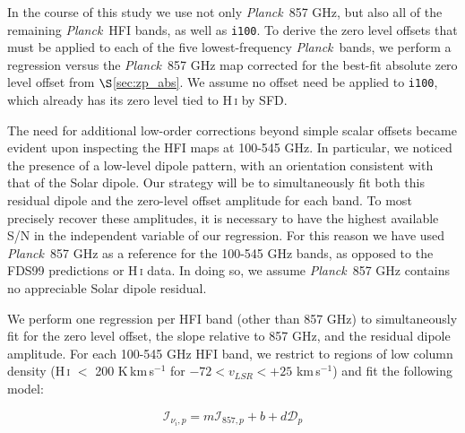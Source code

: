 \documentclass{emulateapj}
\newcommand{\PLANCK}{{\it Planck}}
\begin{document}
In the course of this study we use not only \PLANCK~857 GHz, but also all of
the remaining \PLANCK~HFI bands, as well as \verb|i100|. To derive the 
zero level offsets that must be applied to each of the five lowest-frequency 
\PLANCK~bands, we perform a regression versus the \PLANCK~857 GHz map corrected
for the best-fit absolute zero level offset from $\S$\ref{sec:zp_abs}. We 
assume no offset need be applied to \verb|i100|, which already has its zero 
level tied to H\,\textsc{i} by SFD.

The need for additional low-order corrections beyond simple scalar offsets 
became evident upon inspecting the HFI maps at 100-545 GHz. In particular, we 
noticed the presence of a low-level dipole pattern, with an orientation 
consistent with that of the Solar dipole. Our strategy will be to 
simultaneously fit both this residual dipole and the zero-level offset 
amplitude for each band. To most precisely recover these amplitudes, it is 
necessary to have the highest available S/N in the independent variable of our 
regression. For this reason we have used \PLANCK~857 GHz as a reference for the
100-545 GHz bands, as opposed to the FDS99 predictions or H\,\textsc{i} data. 
In doing so, we assume \PLANCK~857 GHz contains no appreciable Solar dipole 
residual.

We perform one regression per HFI band (other than 857 GHz) to simultaneously 
fit for the zero level offset, the slope relative to 857 GHz, and the residual 
dipole amplitude. For each 100-545 GHz HFI band, we restrict to regions of low 
column density (H\,\textsc{i} $<$ 200 K\,km\,s$^{-1}$ for 
$-72$$<$$v_{LSR}$$<$$+25$ km\,s$^{-1}$) and fit the following model:

\begin{equation} \label{equ:dip}
\mathcal{I}_{\nu_i, p} = m\mathcal{I}_{857, p} + b + d\mathcal{D}_{p}
\end{equation}
\end{document}
